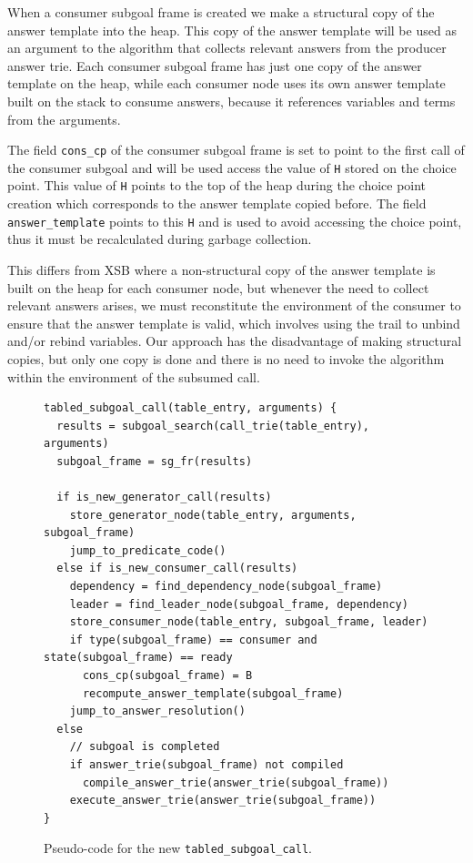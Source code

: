 When a consumer subgoal frame is created we make a structural copy of the answer template
into the heap. This copy of the answer template will be used as an argument
to the algorithm that collects relevant answers from the producer answer trie.
Each consumer subgoal frame has just one copy of the answer template on the heap,
while each consumer node uses its own answer template built on the stack to
consume answers, because it references variables
and terms from the arguments.

The field \texttt{cons\_cp} of the consumer subgoal frame is set to point to the first call
of the consumer subgoal and will be used access the value of \texttt{H} stored on the choice point.
This value of \texttt{H} points to the top of the heap during the choice point creation which corresponds
to the answer template copied before. The field \texttt{answer\_template} points to this \texttt{H}
and is used to avoid accessing the choice point, thus it must be recalculated during garbage collection.

This differs from XSB \cite{XXX} where a non-structural copy of the answer template is built on the heap for each
consumer node, but whenever the need to collect relevant answers arises, we must reconstitute the
environment of the consumer to ensure that the answer template is valid, which involves using the trail
to unbind and/or rebind variables. Our approach has the disadvantage of making structural copies,
but only one copy is done and there is no need to invoke the algorithm
within the environment of the subsumed call.

\begin{figure}[ht]
\begin{Verbatim}
tabled_subgoal_call(table_entry, arguments) {
  results = subgoal_search(call_trie(table_entry), arguments)
  subgoal_frame = sg_fr(results)
  
  if is_new_generator_call(results)
    store_generator_node(table_entry, arguments, subgoal_frame)
    jump_to_predicate_code()
  else if is_new_consumer_call(results)
    dependency = find_dependency_node(subgoal_frame)
    leader = find_leader_node(subgoal_frame, dependency)
    store_consumer_node(table_entry, subgoal_frame, leader)
    if type(subgoal_frame) == consumer and state(subgoal_frame) == ready
      cons_cp(subgoal_frame) = B
      recompute_answer_template(subgoal_frame)
    jump_to_answer_resolution()
  else
    // subgoal is completed
    if answer_trie(subgoal_frame) not compiled
      compile_answer_trie(answer_trie(subgoal_frame))
    execute_answer_trie(answer_trie(subgoal_frame))
}
\end{Verbatim}
\caption{Pseudo-code for the new \texttt{tabled\_subgoal\_call}.}
\label{fig:tabled_subgoal_call_new}
\end{figure}

